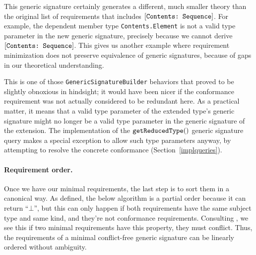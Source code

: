 \documentclass[../generics]{subfiles}
\begin{document}
This generic signature certainly generates a different, much smaller theory than the original list of requirements that includes $[\texttt{Contents:~Sequence}]$. For example, the dependent member type \texttt{Contents.Element} is not a valid type parameter in the new generic signature, precisely because we cannot derive $[\texttt{Contents:~Sequence}]$. This gives us another example where requirement minimization does not preserve equivalence of generic signatures, because of gaps in our theoretical understanding.

This is one of those \texttt{GenericSignatureBuilder} behaviors that proved to be slightly obnoxious in hindsight; it would have been nicer if the conformance requirement was not actually considered to be redundant here. As a practical matter, it means that a valid type parameter of the extended type's generic signature might no longer be a valid type parameter in the generic signature of the extension. The implementation of the $\texttt{getReducedType}()$ generic signature query makes a special exception to allow such type parameters anyway, by attempting to resolve the concrete conformance (Section~\ref{implqueries}).

\paragraph{Requirement order.}
Once we have our minimal requirements, the last step is to sort them in a canonical way. As defined, the below algorithm is a partial order because it can return ``$\bot$'', but this can only happen if both requirements have the same subject type and same kind, and they're not conformance requirements. Consulting , we see this if two minimal requirements have this property, they must conflict. Thus, the requirements of a minimal conflict-free generic signature can be linearly ordered without ambiguity.
\end{document}
